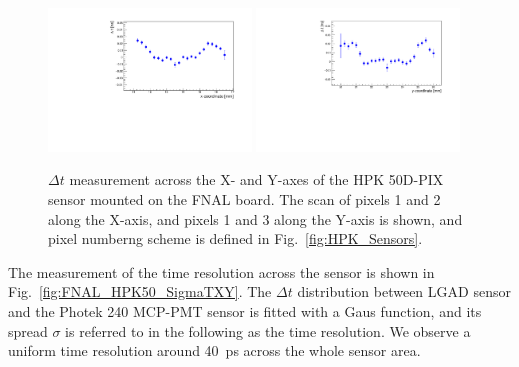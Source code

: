 \documentclass[preprint,1p]{elsarticle}
\begin{document}
\begin{figure}[htbp] 
\centering
\includegraphics[width=0.48\textwidth]{figs/FNALBoard_HPK50DPix_Run847-891/MeanTime_vs_X_Ch4_5.pdf} 
\includegraphics[width=0.48\textwidth]{figs/FNALBoard_HPK50DPix_Run847-891/MeanTime_vs_Y_Ch3_4.pdf} 
\caption{$\Delta t$ measurement across the X- and Y-axes of the HPK 50D-PIX sensor mounted on the FNAL board. The scan of pixels 1 and 2 along the X-axis, and pixels 1 and 3 along the Y-axis is shown, and pixel numberng scheme is defined in Fig.~\ref{fig:HPK_Sensors}.} 
\label{fig:FNAL_HPK50_DTXY} 
\end{figure} 

The measurement of the time resolution across the sensor is shown in
Fig.~\ref{fig:FNAL_HPK50_SigmaTXY}. The $\Delta t$ distribution between LGAD
sensor and the Photek 240 MCP-PMT sensor is fitted with a Gaus function, and its
spread $\sigma$ is referred to in the following as the time resolution. We
observe a uniform time resolution around 40~ps across the whole sensor area. 
\end{document}

